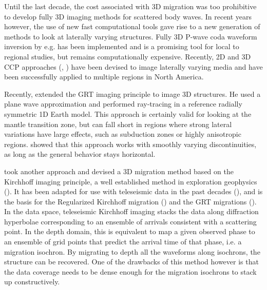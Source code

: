 \documentclass[9pt,a4paper]{article}
\numberwithin{equation}{section}
\begin{document}
\begin{multicols}{2}
Until the last decade, the cost associated with 3D migration was too prohibitive to develop fully 3D imaging methods for scattered body waves. 
In recent years however, the use of new fast computational tools gave rise to a new generation of methods to look at laterally varying structures. 
Fully 3D P-wave coda waveform inversion by e.g. \cite{fred_gji_04} has been implemented and is a promising tool for local to regional studies, but remains computationally expensive. 
Recently, 2D and 3D CCP approaches (\cite{tauz_epsl_16}, \cite{rond_srl_17}) have been devised to image laterally varying media and have been successfully applied to multiple regions in North America. 

Recently, \cite{pavl_cg_11} extended the GRT imaging principle to image 3D structures. 
He used a plane wave approximation and performed ray-tracing in a reference radially symmetric 1D Earth model. 
This approach is certainly valid for looking at the mantle transition zone, but can fall short in regions where strong lateral variations have large effects, such as subduction zones or highly anisotropic regions. 
\cite{wang_jgr_16} showed that this approach works with smoothly varying discontinuities, as long as the general behavior stays horizontal.

\cite{cheng_gji_16} took another approach and devised a 3D migration method based on the Kirchhoff imaging principle, a well established method in exploration geophysics (\cite{clae_book_85}). 
It has been adapted for use with teleseismic data in the past decades (\cite{rybe_gji_00}), and is the basis for the Regularized Kirchhoff migration (\cite{wils_jgr_05}) and the GRT migrations (\cite{bost_jgr_01}). 
In the data space, teleseismic Kirchhoff imaging stacks the data along diffraction hyperbolae corresponding to an ensemble of arrivals consistent with a scattering point. 
In the depth domain, this is equivalent to map a given observed phase to an ensemble of grid points that predict the arrival time of that phase, i.e. a migration isochron. 
By migrating to depth all the waveforms along isochrons, the structure can be recovered. 
One of the drawbacks of this method however is that the data coverage needs to be dense enough for the migration isochrons to stack up constructively.


\end{multicols}
\end{document}
